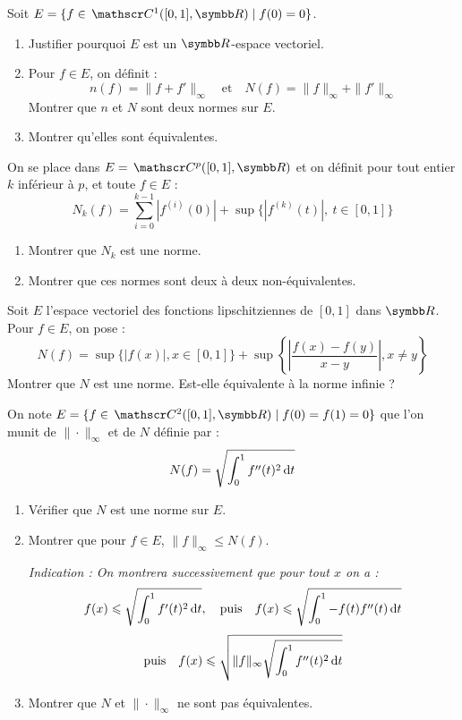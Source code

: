\begin{exercice}
    Soit $E = \{ f \in \mc 1([0,1], \R) \mid f(0)=0 \}$.
    \begin{enumerate}
        \item Justifier pourquoi $E$ est un $\R$-espace vectoriel.
        \item Pour $f \in E$, on définit :
            \[n(f) = \|f+f'\|_\infty \quad \text{et} \quad N(f) = \|f\|_\infty + \|f'\|_\infty\]
            Montrer que $n$ et $N$ sont deux normes sur $E$.
        \item Montrer qu'elles sont équivalentes.
    \end{enumerate}
\end{exercice}

\begin{exercice}
    On se place dans $E = \mc p([0,1], \R)$ et on définit pour tout entier $k$ inférieur à $p$, et toute $f \in E$ :
    \[N_k(f) = \sum_{i=0}^{k-1} |f^{(i)}(0)| + \sup \{ |f^{(k)}(t)|, \ t \in [0,1] \}\]
    \begin{enumerate}
        \item Montrer que $N_k$ est une norme.
        \item Montrer que ces normes sont deux à deux non-équivalentes.
    \end{enumerate}
\end{exercice}

\begin{exercice}
    Soit $E$ l'espace vectoriel des fonctions lipschitziennes de $[0,1]$ dans $\R$. Pour $f \in E$, on pose :
    \[N(f) = \sup \{ |f(x)|, x \in [0,1] \} + \sup \left\{ \left| \frac{f(x)-f(y)}{x-y} \right|, x \ne y \right\}\]
    Montrer que $N$ est une norme. Est-elle équivalente à la norme infinie ?
\end{exercice}

\begin{exercice}
    On note $E = \{ f \in \mc 2([0,1], \R) \mid f(0)=f(1)=0 \}$ que l'on munit de $\|\cdot\|_\infty$ et de $N$ définie par :
    \[N(f) = \sqrt{\int_0^1 f''(t)^2 \,\mathrm{d}t}\]
    \begin{enumerate}
        \item Vérifier que $N$ est une norme sur $E$.
        \item Montrer que pour $f \in E$, $\|f\|_\infty \leqslant N(f)$.
        
            \textit{Indication : On montrera successivement que pour tout $x$ on a :}
            \[f(x) \leqslant \sqrt{\int_0^1 f'(t)^2 \,\mathrm{d}t}, \quad \text{puis} \quad f(x) \leqslant \sqrt{\int_0^1 -f(t)f''(t) \,\mathrm{d}t}\]
            \[\text{puis} \quad f(x) \leqslant \sqrt{\|f\|_\infty \sqrt{\int_0^1 f''(t)^2 \,\mathrm{d}t}}\]
        \item Montrer que $N$ et $\|\cdot\|_\infty$ ne sont pas équivalentes.
    \end{enumerate}
\end{exercice}


